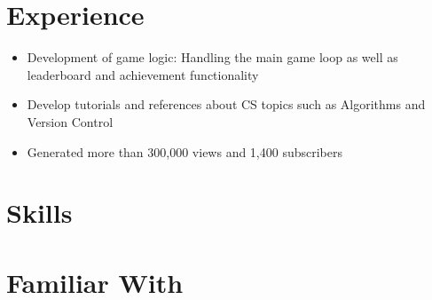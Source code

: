 \documentclass{my_cv}
\begin{document}
\section{Experience \faCogs}
\begin{itemize}
\item Development of game logic: Handling the main game loop as well as leaderboard and achievement functionality 
\end{itemize}
\begin{itemize}
\item Develop tutorials and references about CS topics
  such as Algorithms and Version Control
\item Generated more than 300,000 views and 1,400 subscribers 
\end{itemize}

\section{Skills \faBullseye}
\cvlistitem{\LaTeX}

\section{Familiar With \faPlusSign}

\end{document}

